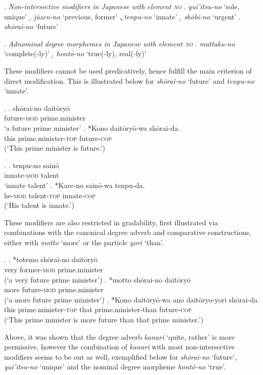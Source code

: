 \documentclass [output=book,colorlinks,citecolor=brown]{langscibook}
\begin{document}
\newpage

\ex. \emph{Non-intersective modifiers in Japanese with element \textsc{no}}
\a. \textit{yui'itsu-no} `sole, unique'
\b. \textit{jūzen-no} `previous, former’
\c. \textit{tenpu-no} `innate’
\d. \textit{shōbi-no} `urgent’
\e. \textit{shōrai-no} `future'

\ex. \emph{Adnominal degree morphemes in Japanese with element \textsc{no}}
\a. \textit{mattaku-no} `complete(-ly)'
\b. \textit{hontō-no} `true(-ly), real(-ly)'

These modifiers cannot be used predicatively, hence fulfill the main criterion of direct modification. This is illustrated below for \textit{shōrai-no} `future’ and \textit{tenpu-no} `innate’. %

\ex. \ag. shōrai-no daitōryō\\
future-\textsc{mod} prime.minister\\
`a future prime minister’
\bg. *Kono daitōryō-wa shōrai-da.\\
this prime.minister-\textsc{top} future-\textsc{cop}\\
(`This prime minister is future.’)

\ex. \ag. tenpu-no sainō\\
innate-\textsc{mod} talent\\
`innate talent’
\bg. *Kare-no sainō-wa tenpu-da.\\
he-\textsc{mod} talent-\textsc{top} innate-\textsc{cop}\\
(`His talent is innate.’)

These modifiers are also restricted in gradability, first illustrated via combinations with the canonical degree adverb and comparative constructions, either with \textit{motto} `more’ or the particle \textit{yori} `than’. %

\ex. \ag. *totemo shōrai-no daitōryō\\
very former-\textsc{mod} prime.minister\\
(`a very future prime minister’)
\bg. *motto shōrai-no daitōryō\\
more future-\textsc{mod} prime.minister\\
(`a more future prime minister’)
\cg. *Kono daitōryō-wa ano daitōryo-yori shōrai-da.\\
this prime.minister-\textsc{top} that prime.minister-than future-\textsc{cop}\\
(`This prime minister is more future than that prime minister.’)

Above, it was shown that the degree adverb \textit{kanari} `quite, rather' is more permissive, however the combination of \textit{kanari} with most non-intersective modifiers seems to be out as well, exemplified below for \textit{shōrai-no} `future’, \textit{yui’itsu-no} `unique’ and the nominal degree morpheme \textit{hontō-no} `true’.
\end{document}
